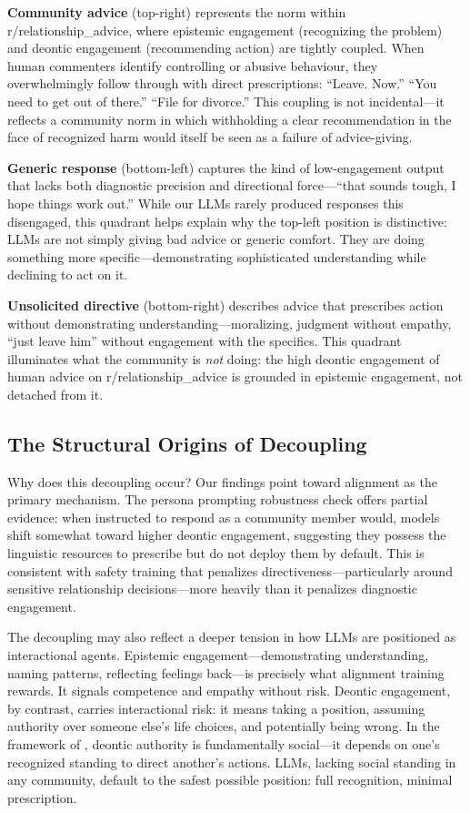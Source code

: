 \textbf{Community advice} (top-right) represents the norm within r/relationship\_advice, where epistemic engagement (recognizing the problem) and deontic engagement (recommending action) are tightly coupled. When human commenters identify controlling or abusive behaviour, they overwhelmingly follow through with direct prescriptions: ``Leave. Now.'' ``You need to get out of there.'' ``File for divorce.'' This coupling is not incidental---it reflects a community norm in which withholding a clear recommendation in the face of recognized harm would itself be seen as a failure of advice-giving.

\textbf{Generic response} (bottom-left) captures the kind of low-engagement output that lacks both diagnostic precision and directional force---``that sounds tough, I hope things work out.'' While our LLMs rarely produced responses this disengaged, this quadrant helps explain why the top-left position is distinctive: LLMs are not simply giving bad advice or generic comfort. They are doing something more specific---demonstrating sophisticated understanding while declining to act on it.

\textbf{Unsolicited directive} (bottom-right) describes advice that prescribes action without demonstrating understanding---moralizing, judgment without empathy, ``just leave him'' without engagement with the specifics. This quadrant illuminates what the community is \textit{not} doing: the high deontic engagement of human advice on r/relationship\_advice is grounded in epistemic engagement, not detached from it.

\subsection{The Structural Origins of Decoupling}

Why does this decoupling occur? Our findings point toward alignment as the primary mechanism. The persona prompting robustness check offers partial evidence: when instructed to respond as a community member would, models shift somewhat toward higher deontic engagement, suggesting they possess the linguistic resources to prescribe but do not deploy them by default. This is consistent with safety training that penalizes directiveness---particularly around sensitive relationship decisions---more heavily than it penalizes diagnostic engagement.

The decoupling may also reflect a deeper tension in how LLMs are positioned as interactional agents. Epistemic engagement---demonstrating understanding, naming patterns, reflecting feelings back---is precisely what alignment training rewards. It signals competence and empathy without risk. Deontic engagement, by contrast, carries interactional risk: it means taking a position, assuming authority over someone else's life choices, and potentially being wrong. In the framework of \citet{stevanovic2012}, deontic authority is fundamentally social---it depends on one's recognized standing to direct another's actions. LLMs, lacking social standing in any community, default to the safest possible position: full recognition, minimal prescription.

